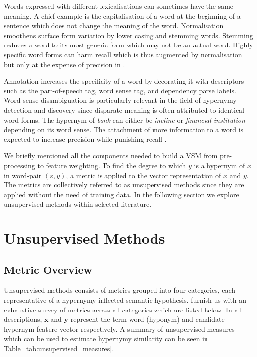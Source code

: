 Words expressed with different lexicalisations can sometimes have the same meaning.  A chief example is the capitalisation of a word at the beginning of a sentence which does not change the meaning of the word. Normalisation smoothens surface form variation by lower casing and stemming words. Stemming reduces a word to its most generic form which may not be an actual word.  Highly specific word forms can harm recall which is thus augmented by normalisation but only at the expense of precision \citep{kraaij1996viewing} in \citep{turney2010frequency}.

Annotation increases the specificity of a word by decorating it with descriptors such as the part-of-speech tag, word sense tag, and dependency parse labels.  Word sense disambiguation is particularly relevant in the field of hypernymy detection and discovery since disparate meaning is often attributed to identical word forms.  The hypernym of \textit{bank} can either be \textit{incline} or \textit{financial institution} depending on its word sense.  The attachment of more information to a word is expected to increase precision while punishing recall \citep{turney2010frequency}.

We briefly mentioned all the components needed to build a \ac{VSM} from pre-processing to feature weighting.  To find the degree to which $y$ is a hypernym of $x$ in word-pair $(x, y)$, a metric is applied to the vector representation of $x$ and $y$.  The metrics are collectively referred to as unsupervised methods since they are applied without the need of training data.  In the following section we explore unsupervised methods within selected literature.

\section{Unsupervised Methods}
\subsection{Metric Overview}
Unsupervised methods consists of metrics grouped into four categories, each representative of a hypernymy inflected semantic hypothesis.  \citeauthor{shwartz2017siege} furnish us with an exhaustive survey of metrics across all categories which are listed below.  In all descriptions, $\textbf{x}$ and $\textbf{y}$ represent the term word (hyponym) and candidate hypernym feature vector respectively.  A summary of unsupervised measures which can be used to estimate hypernymy similarity can be seen in Table~\ref{tab:unsupervised_measures}.

